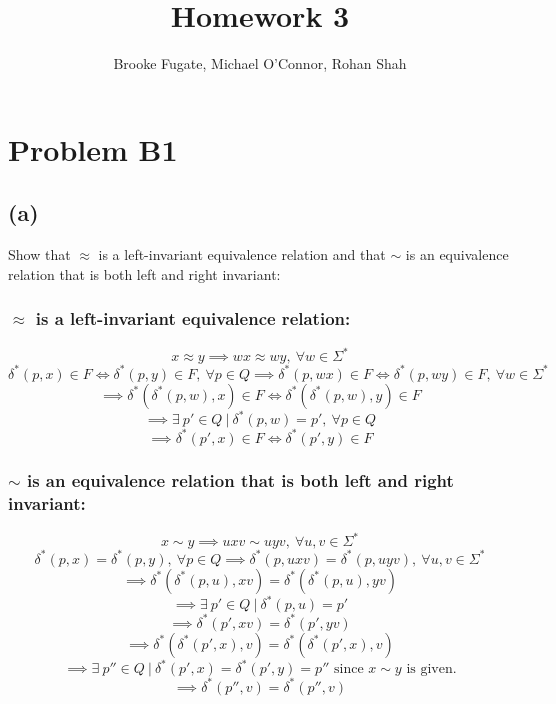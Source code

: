 \documentclass[12pt]{article}
\begin{document}
\pagestyle{plain}
\titleformat{\subsection}[runin]
  {\normalfont\large\bfseries}{\thesubsection}{1em}{}

\title{Homework 3}
\author{Brooke Fugate, Michael O'Connor, Rohan Shah}
\date{}

\maketitle

\section*{Problem B1}
\subsection*{(a)} Show that $\approx$ is a left-invariant equivalence relation
and that $\sim$ is an equivalence relation that is both left and right invariant:
\subsubsection*{$\approx$ is a left-invariant equivalence relation:}
$$x \approx y \implies wx \approx wy ,\ \forall w \in \Sigma^*$$
$$\delta^*(p,x) \in F \iff \delta^*(p,y) \in F,\ \forall p \in Q \implies
\delta^*(p,wx) \in F \iff \delta^*(p,wy) \in F,\ \forall w \in \Sigma^*$$
$$\implies \delta^*(\delta^*(p,w),x) \in F \iff
\delta^*(\delta^*(p,w),y) \in F$$
$$\implies \exists \ p' \in Q \ | \ \delta^*(p,w) = p',
\ \forall p \in Q$$
$$\implies \delta^*(p',x) \in F \iff \delta^*(p',y) \in F$$
\subsubsection*{$\sim$ is an equivalence relation that is both left
and right invariant:}
$$x \sim y \implies uxv \sim uyv,\ \forall u, v \in \Sigma^*$$
$$\delta^*(p,x) = \delta^*(p,y),\ \forall p \in Q \implies
\delta^*(p,uxv) = \delta^*(p,uyv),\ \forall u,v \in \Sigma^*$$
$$\implies \delta^*(\delta^*(p,u), xv) = \delta^*(\delta^*(p,u), yv)$$
$$\implies \exists\ p' \in Q\ |\ \delta^*(p,u) = p'$$
$$\implies \delta^*(p',xv) = \delta^*(p', yv)$$
$$\implies \delta^*(\delta^*(p',x),v) = \delta^*(\delta^*(p',x),v)$$
$$\implies \exists\ p'' \in Q\ |\ \delta^*(p',x) = \delta^*(p',y) = p''
\text{ since } x \sim y \text{ is given.}$$
$$\implies \delta^*(p'',v) = \delta^*(p'',v)$$
\end{document}
